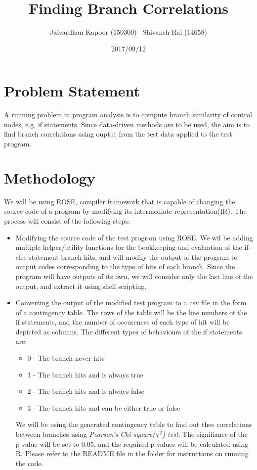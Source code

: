 \documentclass[a4paper]{article}
\title{Finding Branch Correlations}
\author{Jaivardhan Kapoor (150300) \ Shivansh Rai (14658)}
\date{2017/09/12}
\begin{document}
\maketitle

\section{Problem Statement}
A running problem in program analysis is to compute branch similarity of control nodes, e.g. if statements. Since data-driven methods are to be used, the aim is to find branch correlations using ouptut from the test data applied to the test program.

\section{Methodology}
We will be using ROSE, compiler framework that is capable of changing the source code of a program by modifying its intermediate representation(IR). The process will consist of the following steps:

\begin{itemize}
\item Modifying the source code of the test program using ROSE. We wil be adding multiple helper/utility functions for the bookkeeping and evaluation of the if-else statement branch hits, and will modify the output of the program to output codes corresponding to the type of hits of each branch. Since the program will have outputs of its own, we will consider only the last line of the output, and extract it using shell scripting.
\item Converting the output of the modified test program to a csv file in the form of a contingency table. The rows of the table will be the line numbers of the if statements, and the number of occurences of each type of hit will be depicted as columns. The different types of behaviours of the if statements are:
\begin{itemize}
\item 0 - The branch never hits
\item 1 - The branch hits and is always true
\item 2 - The branch hits and is always false
\item 3 - The branch hits and can be either true or false
\end{itemize}
We will be using the generated contingency table to find out thee correlations between branches using \textit{Pearson's Chi-square($\chi^2$) test}. The signifiance of the p-value will be set to $0.05$, and the required p-values will be calculated using R. Please refer to the README file in the folder for instructions on running the code.
\end{itemize}
\end{document}
